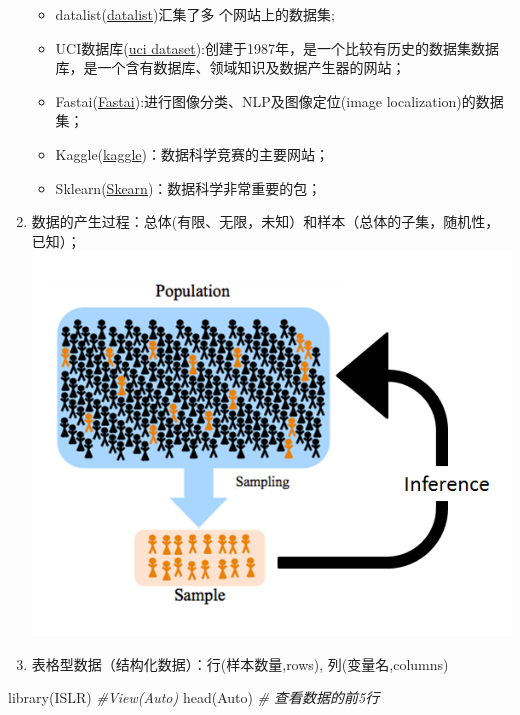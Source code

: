 \documentclass[
]{book}
\newenvironment{Shaded}{\begin{snugshade}}{\end{snugshade}}
\newcommand{\CommentTok}[1]{\textcolor[rgb]{0.56,0.35,0.01}{\textit{#1}}}
\newcommand{\FunctionTok}[1]{\textcolor[rgb]{0.00,0.00,0.00}{#1}}
\newcommand{\NormalTok}[1]{#1}
\providecommand{\tightlist}{%
  \setlength{\itemsep}{0pt}\setlength{\parskip}{0pt}}
\begin{document}
\begin{enumerate}
  \begin{itemize}
  \tightlist
  \item
    datalist(\href{https://www.datasetlist.com/}{datalist})汇集了多 个网站上的数据集;
  \item
    UCI数据库(\href{http://archive.ics.uci.edu/ml/datasets.php}{uci dataset}):创建于1987年，是一个比较有历史的数据集数据库，是一个含有数据库、领域知识及数据产生器的网站；
  \item
    Fastai(\href{https://course.fast.ai/datasets}{Fastai}):进行图像分类、NLP及图像定位(image localization)的数据集；
  \item
    Kaggle(\href{https://www.kaggle.com/datasets}{kaggle})：数据科学竞赛的主要网站；
  \item
    Sklearn(\href{https://scikit-learn.org/stable/}{Skearn})：数据科学非常重要的包；
  \end{itemize}
\item
  数据的产生过程：总体(有限、无限，未知）和样本（总体的子集，随机性，已知）；
  \includegraphics{pics/population-sample.png}
\item
  表格型数据（结构化数据）：行(样本数量,rows), 列(变量名,columns)
\end{enumerate}

\begin{Shaded}
\begin{Highlighting}[]
\FunctionTok{library}\NormalTok{(ISLR)}
\CommentTok{\#View(Auto)}
\FunctionTok{head}\NormalTok{(Auto) }\CommentTok{\# 查看数据的前5行}
\end{Highlighting}
\end{Shaded}
\end{document}
